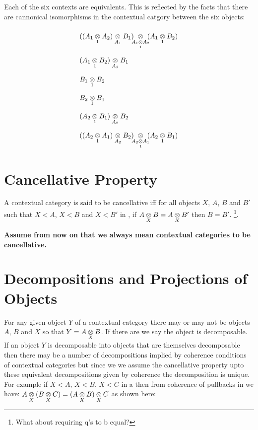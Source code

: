 \documentclass[10pt,a4paper]{scrartcl}
\begin{document}
Each of the six contexts are equivalents. This is reflected by the facts that there are cannonical 
isomorphisms in the contextual catgory between the six objects: \\
\begin{displaymath}
\def\arraystretch{2.2}
\begin{array} {l}
      \crossx
          {(\crossx
			       {(\crossx{A_1}{A_2}{1})}
						 {B_1}
						 {A_1}
			     ) 
			     \hspace{-0.2cm}
					}
					{\hspace{-0.2cm}(\crossx{A_1}{B_2}{1})}
					{\crossx{A_1}{A_2}{1}}
\\
    \crossx
       {(\crossx{A_1}{B_2}{1})}
							{B_1}
							{A_1}
\\

     \crossx{B_1}{B_2}{1}
\\
     \crossx{B_2}{B_1}{1}
\\
     \crossx
           {(\crossx{A_2}{B_1}{1})}
					 {B_2}
					 {A_2}
\\
     \crossx
              {(\crossx
							     {(\crossx{A_2}{A_1}{1})}
									 {B_2}
									 {A_2}
								) 
								\hspace{-0.2cm}
							}
							{\hspace{-0.2cm}(\crossx{A_2}{B_1}{1})}
							{\crossx{A_2}{A_1}{1}} 

\end{array}
\end{displaymath}
\section{Cancellative Property}
\noindent 
\begin{definition}
A contextual category \ccat is said to be cancellative iff for all objects $X$, $A$, $B$ and $B'$ such that
$X < A$, $X < B$ and $X < B'$ in \ccat, 
if $\crossx{A}{B}{X} = \crossx{A}{B'}{X}$ then $B=B'$. \footnote{What about requiring q's to b equal?}.
\end{definition} 
\textbf{Assume from now on that we always mean contextual categories to be cancellative.}

\section{Decompositions and Projections of Objects}
For any given object $Y$ of a contextual category there may or may not be objects $A$, $B$ and $X$ so that
$Y = \crossx{A}{B}{X}$. If there are we say the object is decomposable. If an object $Y$ is decomposable into objects that
are themselves decomposable then there may be a number of decompositions implied by coherence conditions of contextual
categories but since we we assume the cancellative property upto these equivalent decompositions given by coherence
the decomposition is unique. 
\noindent
For example if $X < A$, $X < B$, $X < C$ in a \ccat then from coherence of pullbacks in \ccat we have:
$\crossx{A}{(\crossx{B}{C}{X})}{X} = \crossx{(\crossx{A}{B}{X})}{C}{X}$ as shown here:
 
\end{document}
